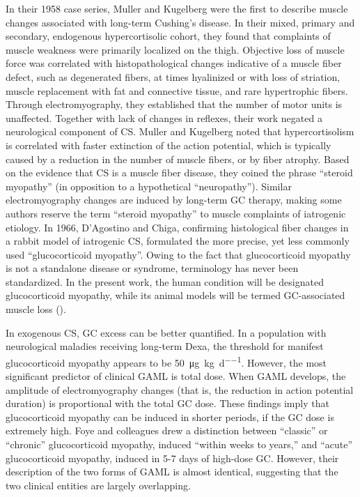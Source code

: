 \documentclass[12pt,english]{report}\usepackage[]{graphicx}\usepackage[]{color}
\begin{document}
In their 1958 case series, Muller and Kugelberg were the first to
describe muscle changes associated with long-term Cushing's disease\citep{muller1959myopathy}.
In their mixed, primary and secondary, endogenous hypercortisolic
cohort, they found that complaints of muscle weakness were primarily
localized on the thigh. Objective loss of muscle force was correlated
with histopathological changes indicative of a muscle fiber defect,
such as degenerated fibers, at times hyalinized or with loss of striation,
muscle replacement with fat and connective tissue, and rare hypertrophic
fibers. Through electromyography, they established that the number
of motor units is unaffected. Together with lack of changes in reflexes,
their work negated a neurological component of CS. Muller and Kugelberg
noted that hypercortisolism is correlated with faster extinction of
the action potential, which is typically caused by a reduction in
the number of muscle fibers, or by fiber atrophy\citep{rodriguez-carreno2012motor}.
Based on the evidence that CS is a muscle fiber disease, they coined
the phrase ``steroid myopathy'' (in opposition to a hypothetical
``neuropathy''). Similar electromyography changes are induced by
long-term GC therapy\citep{dropcho1991steroid-induced}, making some
authors reserve the term ``steroid myopathy'' to muscle complaints
of iatrogenic etiology. In 1966, D'Agostino and Chiga, confirming
histological fiber changes in a rabbit model of iatrogenic CS, formulated
the more precise, yet less commonly used ``glucocorticoid myopathy''\citep{dagostino1966cortisone}.
Owing to the fact that glucocorticoid myopathy is not a standalone
disease or syndrome, terminology has never been standardized. In the
present work, the human condition will be designated glucocorticoid
myopathy, while its animal models will be termed GC-associated muscle
loss ().

In exogenous CS, GC excess can be better quantified. In a population
with neurological maladies receiving long-term Dexa, the threshold
for manifest glucocorticoid myopathy appears to be \SI{50}{\micro\gram\per\kilo\gram\per\day}\citep{vecht1994dose-effect}.
However, the most significant predictor of clinical GAML is total
dose\citep{batchelor1997steroid,shee1990risk}. When GAML develops,
the amplitude of electromyography changes (that is, the reduction
in action potential duration) is proportional with the total GC dose\citep{coomes1965corticosteroid}.
These findings imply that glucocorticoid myopathy can be induced in
shorter periods, if the GC dose is extremely high. Foye and colleagues
drew a distinction between ``classic'' or ``chronic'' glucocorticoid
myopathy, induced ``within weeks to years,'' and ``acute'' glucocorticoid
myopathy, induced in 5-7 days of high-dose GC\citep{foye2014corticosteroid-induced}.
However, their description of the two forms of GAML is almost identical,
suggesting that the two clinical entities are largely overlapping.
\end{document}
